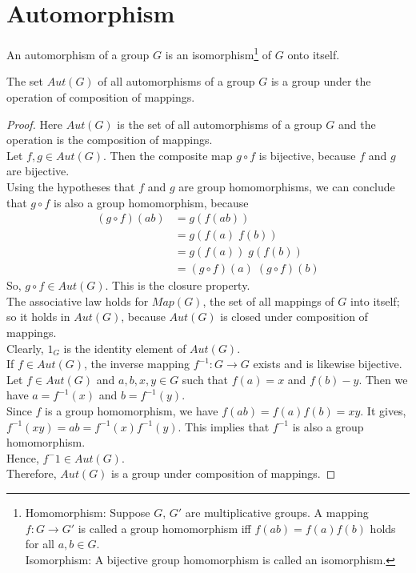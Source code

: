 \documentclass[../main-sheet.tex]{subfiles}
\begin{document}
\chapter{Automorphism}
\begin{defn}[Automorphism]
    An automorphism of a group \(G\) is an isomorphism\footnote{
        Homomorphism: Suppose \(G,\,G'\) are multiplicative groups. A mapping \(f:G\to G'\) is called a group homomorphism iff \(f(ab)=f(a)f(b)\) holds for all \(a,b\in G\).\\
        Isomorphism: A bijective group homomorphism is called an isomorphism. 
    } of \(G\) onto itself.
\end{defn}
\begin{thm}
    The set \(Aut(G)\) of all automorphisms of a group \(G\) is a group under the operation of composition of mappings.
\end{thm}
\begin{proof}
    Here \(Aut(G)\) is the set of all automorphisms of a group \(G\) and the operation is the composition of mappings.\\
    Let \(f,g\in Aut(G)\). Then the composite map \(g \circ f\) is bijective, because \(f\) and \(g\) are bijective.\\
    Using the hypotheses that \(f\) and \(g\) are group homomorphisms, we can conclude that \(g\circ f\) is also a group homomorphism, because
    \begin{align*}
        (g\circ f)(ab)&=g(f(ab))\\
        &=g(f(a)\;f(b))\\
        &=g(f(a))\;g(f(b))\\
        &=(g\circ f)(a)\;(g\circ f)(b)
    \end{align*} 
    So, \(g\circ f \in Aut(G)\). This is the closure property.\\

    The associative law holds for \(Map(G)\), the set of all mappings of \(G\) into itself; so it holds in \(Aut(G)\), because \(Aut(G)\) is closed under composition of mappings.\\

    Clearly, \(1_G\) is the identity element of \(Aut(G)\).\\

    If \(f\in Aut(G)\), the inverse mapping \(f^{-1}:G\to G\) exists and is likewise bijective. Let \(f\in Aut(G)\) and \(a,b,x,y\in G\) such that \(f(a)=x\) and \(f(b)-y\).
    Then we have \(a=f^{-1}(x)\) and \(b=f^{-1}(y)\).\\
    Since \(f\) is a group homomorphism, we have \(f(ab)=f(a)f(b)=xy\). It gives, \(f^{-1}(xy)=ab=f^{-1}(x)f^{-1}(y)\). This implies that \(f^{-1}\) is also a group homomorphism.\\
    Hence, \(f^-1\in Aut(G)\).\\
    Therefore, \(Aut(G)\) is a group under composition of mappings.
\end{proof}
\end{document}
